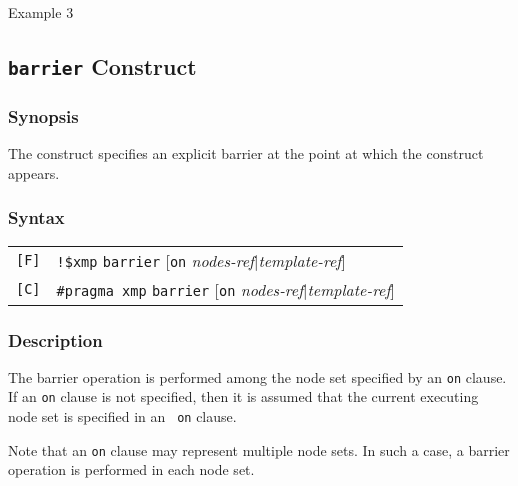\begin{description}
\item[Example 3]
\hspace{\hsize}

\end{description}

\subsection{{\tt barrier} Construct}

\subsubsection*{Synopsis}

The {\tt {}} construct specifies an explicit barrier
at the point at which the construct appears. 

\subsubsection*{Syntax}

\begin{tabular}{ll}
\verb![F]! & \verb|!$xmp| {\tt barrier} [{\tt on} {\it nodes-ref}$\vert${\it template-ref}] \\
\verb![C]! & \verb|#pragma xmp| {\tt barrier} [{\tt on} {\it nodes-ref}$\vert${\it template-ref}] \\
\end{tabular}

\subsubsection*{Description}

The barrier operation is performed among the node set specified by
an {\tt on} clause. If an {\tt on} clause is not specified, then it is
assumed that the current executing node set is specified in an {\tt
on} clause.

Note that an {\tt on} clause may represent multiple node sets. In such a
case, a barrier operation is performed in each node set.


